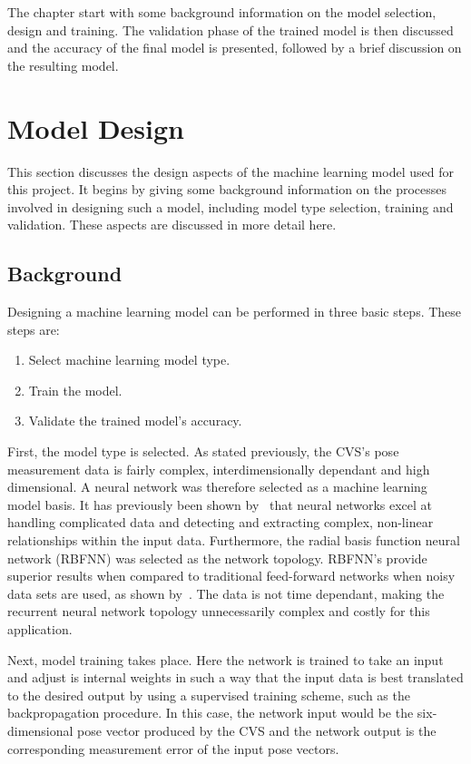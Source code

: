 The chapter start with some background information on the model selection, design and training. The validation phase of the trained model is then discussed and the accuracy of the final model is presented, followed by a brief discussion on the resulting model. 

\section{Model Design}

This section discusses the design aspects of the machine learning model used for this project. It begins by giving some background information on the processes involved in designing such a model, including model type selection, training and validation. These aspects are discussed in more detail here.  

\subsection{Background}

Designing a machine learning model can be performed in three basic steps. These steps are:

\begin{enumerate}
  \item Select machine learning model type.
  \item Train the model.
  \item Validate the trained model's accuracy. 
\end{enumerate}

First, the model type is selected. As stated previously, the CVS's pose measurement data is fairly complex, interdimensionally dependant and high dimensional. A neural network was therefore selected as a machine learning model basis. It has previously been shown by~\cite{tu1996advantages} that neural networks excel at handling complicated data and detecting and extracting complex, non-linear relationships within the input data. Furthermore, the radial basis function neural network (RBFNN) was selected as the network topology. RBFNN's provide superior results when compared to traditional feed-forward networks when noisy data sets are used, as shown by~\cite{xie2011comparison}. The data is not time dependant, making the recurrent neural network topology unnecessarily complex and costly for this application.  

Next, model training takes place. Here the network is trained to take an input and adjust is internal weights in such a way that the input data is best translated to the desired output by using a supervised training scheme, such as the backpropagation procedure. In this case, the network input would be the six-dimensional pose vector produced by the CVS and the network output is the corresponding measurement error of the input pose vectors.  

